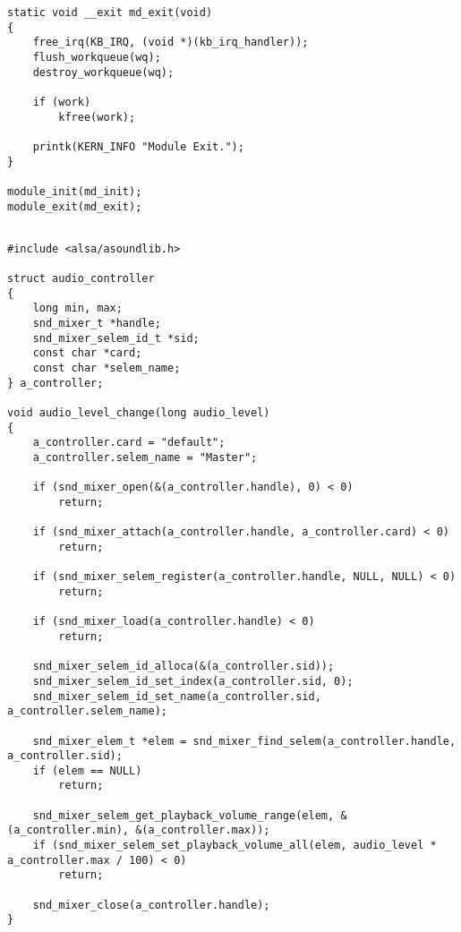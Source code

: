 \begin{appendices}
\begin{lstlisting}[caption={Листинг audio\_module.c(часть 4)}]
static void __exit md_exit(void)
{
    free_irq(KB_IRQ, (void *)(kb_irq_handler));
    flush_workqueue(wq);
    destroy_workqueue(wq);

    if (work)
        kfree(work);

    printk(KERN_INFO "Module Exit.");
}

module_init(md_init);
module_exit(md_exit);
\end{lstlisting}

\clearpage

\begin{lstlisting}[caption={Листинг audio\_controller.c}]

#include <alsa/asoundlib.h>

struct audio_controller
{
    long min, max;
    snd_mixer_t *handle;
    snd_mixer_selem_id_t *sid;
    const char *card;
    const char *selem_name;
} a_controller;

void audio_level_change(long audio_level)
{
    a_controller.card = "default";
    a_controller.selem_name = "Master";

    if (snd_mixer_open(&(a_controller.handle), 0) < 0)
        return;

    if (snd_mixer_attach(a_controller.handle, a_controller.card) < 0)
        return;

    if (snd_mixer_selem_register(a_controller.handle, NULL, NULL) < 0)
        return;

    if (snd_mixer_load(a_controller.handle) < 0)
        return;

    snd_mixer_selem_id_alloca(&(a_controller.sid));
    snd_mixer_selem_id_set_index(a_controller.sid, 0);
    snd_mixer_selem_id_set_name(a_controller.sid, a_controller.selem_name);

    snd_mixer_elem_t *elem = snd_mixer_find_selem(a_controller.handle, a_controller.sid);
    if (elem == NULL)
        return;

    snd_mixer_selem_get_playback_volume_range(elem, &(a_controller.min), &(a_controller.max));
    if (snd_mixer_selem_set_playback_volume_all(elem, audio_level * a_controller.max / 100) < 0)
        return;

    snd_mixer_close(a_controller.handle);
}
\end{lstlisting}


\end{appendices}